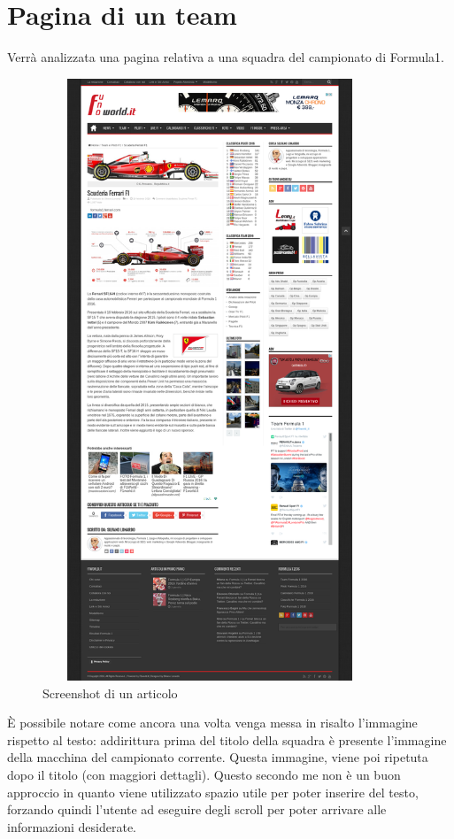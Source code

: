 \section{Pagina di un team}
Verrà analizzata una pagina relativa a una squadra del campionato di Formula1.

\begin{figure}[h] %
  \centering
  \includegraphics[height=18cm, width=10cm]{res/img/TeamPage_Full}
  \caption{Screenshot di un articolo}
\end{figure}

È possibile notare come ancora una volta venga messa in risalto l'immagine
rispetto al testo: addirittura prima del titolo della squadra è presente
l'immagine della macchina del campionato corrente. Questa immagine, viene poi
ripetuta dopo il titolo (con maggiori dettagli). Questo secondo me non è un buon
approccio in quanto viene utilizzato spazio utile per poter inserire del testo,
forzando quindi l'utente ad eseguire degli scroll per poter arrivare alle
informazioni desiderate.

